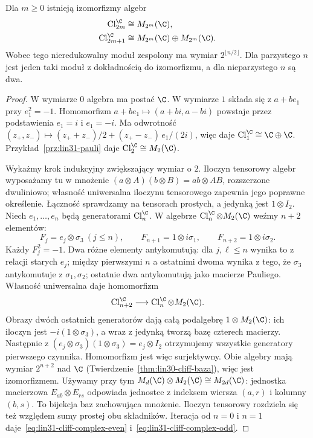 \begin{twierdzenie}
\label{thm:lin31-cliff-kompleks}
Dla $m\geq0$ istnieją izomorfizmy algebr
\begin{align}
 \operatorname{Cl}^{\C}_{2m}
   &\cong M_{2^m}(\C), \label{eq:lin31-cliff-complex-even}\\
 \operatorname{Cl}^{\C}_{2m+1}
   &\cong M_{2^m}(\C)\oplus M_{2^m}(\C).
   \label{eq:lin31-cliff-complex-odd}
\end{align}
Wobec tego nieredukowalny moduł zespolony
ma wymiar $2^{\lfloor n/2\rfloor}$.
Dla parzystego $n$ jest jeden taki moduł
z dokładnością do izomorfizmu, a dla
nieparzystego $n$ są dwa.
\end{twierdzenie}
\begin{proof}
W wymiarze $0$ algebra ma postać $\C$.
W wymiarze $1$ składa się z $a+be_1$ przy
$e_1^2=-1$. Homomorfizm
$a+be_1\mapsto(a+bi,a-bi)$ powstaje przez podstawienia
$e_1=i$ i $e_1=-i$.
Ma odwrotność
$(z_+,z_-)\mapsto(z_++z_-)/2+(z_+-z_-)\,e_1/(2i)$,
więc daje $\operatorname{Cl}^{\C}_1\cong\C\oplus\C$.
Przykład~\ref{prz:lin31-pauli} daje
$\operatorname{Cl}^{\C}_2\cong M_2(\C)$.

Wykażmy krok indukcyjny zwiększający wymiar o $2$.
Iloczyn tensorowy algebr wyposażamy tu w mnożenie
$(a\otimes A)(b\otimes B)=ab\otimes AB$, rozszerzone
dwuliniowo; własność uniwersalna iloczynu tensorowego zapewnia
jego poprawne określenie. Łączność sprawdzamy na tensorach
prostych, a jedynką jest $1\otimes I_2$.
Niech $e_1,\ldots,e_n$ będą generatorami
$\operatorname{Cl}^{\C}_n$. W algebrze
$\operatorname{Cl}^{\C}_n\otimes M_2(\C)$
weźmy $n+2$ elementów:
\[
 F_j=e_j\otimes\sigma_3\ (j\leq n),\qquad
 F_{n+1}=1\otimes i\sigma_1,\qquad
 F_{n+2}=1\otimes i\sigma_2.
\]
Każdy $F_j^2=-1$. Dwa różne elementy
antykomutują: dla $j,\ell\leq n$ wynika
to z relacji starych $e_j$; między pierwszymi
$n$ a ostatnimi dwoma wynika z tego, że
$\sigma_3$ antykomutuje z $\sigma_1,\sigma_2$;
ostatnie dwa antykomutują jako macierze Pauliego.
Własność uniwersalna daje homomorfizm
\[
 \operatorname{Cl}^{\C}_{n+2}
    \longrightarrow
   \operatorname{Cl}^{\C}_n\otimes M_2(\C).
\]
Obrazy dwóch ostatnich generatorów dają całą
podalgebrę $1\otimes M_2(\C)$:
ich iloczyn jest $-i(1\otimes\sigma_3)$,
a wraz z jedynką tworzą bazę czterech macierzy.
Następnie z
$(e_j\otimes\sigma_3)(1\otimes\sigma_3)
=e_j\otimes I_2$ otrzymujemy wszystkie
generatory pierwszego czynnika. Homomorfizm
jest więc surjektywny. Obie algebry mają
wymiar $2^{n+2}$ nad $\C$
(Twierdzenie~\ref{thm:lin30-cliff-baza}),
więc jest izomorfizmem. Używamy przy tym
$M_d(\C)\otimes M_2(\C)\cong M_{2d}(\C)$:
jednostka macierzowa $E_{ab}\otimes E_{rs}$ odpowiada
jednostce z indeksem wiersza $(a,r)$ i kolumny $(b,s)$.
To bijekcja baz zachowująca mnożenie. Iloczyn tensorowy
rozdziela się też względem sumy prostej obu składników.
Iteracja od $n=0$
i $n=1$ daje~\eqref{eq:lin31-cliff-complex-even}
i~\eqref{eq:lin31-cliff-complex-odd}.


\end{proof}
